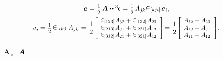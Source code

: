\nopagebreak\vspace{-0.5em}\begin{equation*}\begin{array}{c}
\bm{a} = \smalldisplaystyleonehalf \, \bm{A} \dotdotp \permutationsparitytensor =
\smalldisplaystyleonehalf \hspace{.25ex} A_{j\hspace{-0.1ex}k} \permutationsparitysymbols{kj\hspace{-0.06ex}i} \hspace{.2ex} \bm{e}_i , \\[0.64em]
a_{i} \hspace{-0.16ex} = \smalldisplaystyleonehalf \hspace{.32ex} \permutationsparitysymbols{ikj} \hspace{.1ex} A_{j\hspace{-0.1ex}k} = \hspace{.1em}
\displaystyle \onehalf \scalebox{0.9}[0.9]{$\left[\hspace{-0.25ex} \begin{array}{c}
\permutationsparitysymbols{123} \hspace{.1ex} A_{32} + \permutationsparitysymbols{132} \hspace{.1ex} A_{23} \\
\permutationsparitysymbols{213} \hspace{.1ex} A_{31} + \permutationsparitysymbols{231} \hspace{.1ex} A_{13} \\
\permutationsparitysymbols{312} \hspace{.1ex} A_{21} + \permutationsparitysymbols{321} \hspace{.1ex} A_{12}
\end{array} \right]$} \hspace{-0.2em} = \hspace{.1em}
\displaystyle \onehalf \scalebox{0.9}[0.9]{$\left[\hspace{-0.3ex} \begin{array}{c}
A_{32} - A_{23} \\
A_{13} - A_{31} \\
A_{21} - A_{12}
\end{array} \right]$} .
\vspace{.1em}\end{array}\end{equation*}

${\!\bm{A}_{\!\bm{\times}}}$
~${\hspace{-0.2ex}\bm{A}}$

